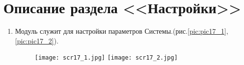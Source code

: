 \section{Описание раздела <<Настройки>>}
\begin{enumerate}[\thesection .1]
\item Модуль служит для настройки параметров Системы.(рис.\ref {pic:pic17_1},\ref {pic:pic17_2}).\\
\begin{figure}[h!]
	\begin{floatrow}
		{\texttt{[image: scr17\_1.jpg]}}
		{\texttt{[image: scr17\_2.jpg]}}         
	\end{floatrow}
\end{figure}


\end{enumerate}
